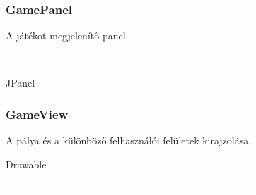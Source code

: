 \subsubsection{GamePanel}
\begin{class-template-responsibility}
    A játékot megjelenítő panel.
\end{class-template-responsibility}
\begin{class-template-interface}
    -
\end{class-template-interface}
\begin{class-template-baseclass}
    JPanel
\end{class-template-baseclass}
\begin{class-template-attribute}
\end{class-template-attribute}
\begin{class-template-method}
\end{class-template-method}

\subsubsection{GameView}
\begin{class-template-responsibility}
    A pálya és a különböző felhasználói felületek kirajzolása.
\end{class-template-responsibility}
\begin{class-template-interface}
    Drawable
\end{class-template-interface}
\begin{class-template-baseclass}
    -
\end{class-template-baseclass}
\begin{class-template-attribute}
\end{class-template-attribute}
\begin{class-template-method}
\end{class-template-method}

